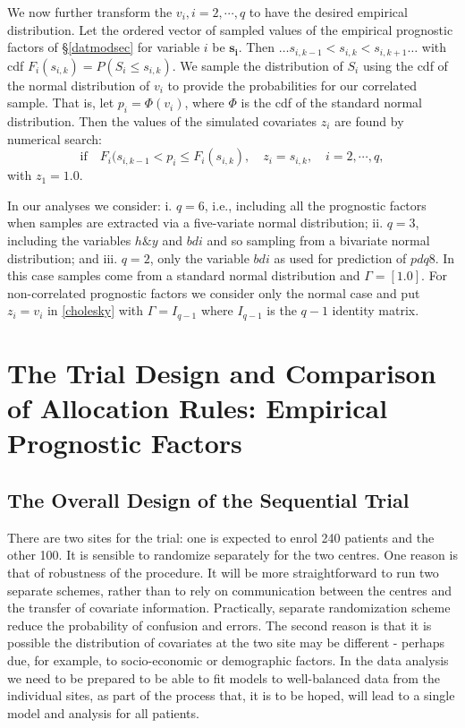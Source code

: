 \documentclass[number,12pt,review]{elsarticle}
\begin{document}
We now further transform the $v_i,i=2,\cdots,q$ to have the desired empirical distribution.   Let the ordered vector of sampled values of the empirical prognostic factors of \S\ref{datmodsec}  for variable $i$ be $\mathbf{s_i}$. Then  $\ldots s_{i,k-1} < s_{i,k} < s_{i,k+1} \ldots$ with cdf $F_i(s_{i,k}) = P(S_i \le s_{i,k})$.  We sample the distribution of $S_i$ using the cdf of the normal distribution of $v_i$ to provide the probabilities for our correlated sample. That is, let $p_i = \Phi(v_i)$, where $\Phi$ is the cdf of the standard normal distribution. Then the values of the simulated covariates $z_i$ are found by numerical search:
\begin{equation}
\text{if}\quad  F_i(s_{i,k-1} < p_i \le F_i(s_{i,k}),\quad  z_i = s_{i,k}, \quad i=2,\cdots,q,
\label{samplecdf}
\end{equation}
with $z_1=1.0$.

In our analyses we consider: i. $q=6$, i.e., including all the prognostic factors when samples are extracted via a five-variate normal distribution; ii. $q=3$, including the variables $h\&y$ and $bdi$  and so sampling from a bivariate normal distribution; and iii. $q=2$, only the variable $bdi$ as used for prediction
of $pdq8$. In this case  samples come from a standard normal distribution and $\Gamma=[1.0]$. For non-correlated prognostic factors we consider only the normal case and put $z_i = v_i$ in \eqref{cholesky} with $\Gamma=I_{q-1}$ where $I_{q-1}$ is the $q-1$ identity matrix.


\section{The Trial Design and Comparison of Allocation Rules: Empirical Prognostic Factors}

\label{trialcomp}

\subsection{The Overall Design of the Sequential Trial}

\label{overallsec}

There are two sites for the trial: one is expected to enrol 240 patients and the other 100. It is sensible to randomize separately for the  two centres. One reason is that of robustness of the procedure. It will be more straightforward to run two separate schemes, rather than to rely on communication between the centres and the transfer of covariate information. Practically, separate randomization scheme reduce the probability of confusion and errors. The second reason is that it is possible the distribution of covariates at the two site may be different - perhaps due, for example, to socio-economic or demographic factors. In the data analysis we need to be prepared  to be able to fit models to well-balanced data from the individual sites, as part of the process that, it is to be hoped, will lead to a single model and analysis for all patients.
\end{document}
